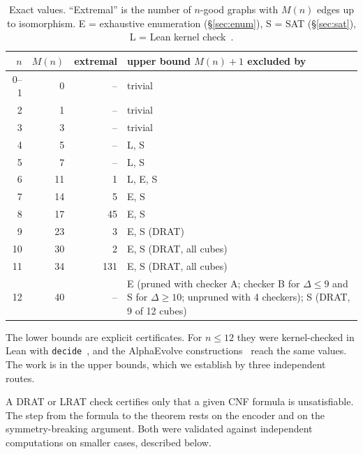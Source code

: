 \documentclass[11pt]{amsart}
\theoremstyle{definition}
\newcommand{\M}{M}
\begin{document}
\begin{table}[ht]
\centering
\caption{Exact values. ``Extremal'' is the number of $n$-good graphs with $\M(n)$ edges up
to isomorphism. E = exhaustive enumeration (\S\ref{sec:enum}), S = SAT
(\S\ref{sec:sat}), L = Lean kernel check~\cite{Repo}.}
\label{tab:exact}
\begin{tabular}{rrrp{}}
\toprule
$n$ & $\M(n)$ & extremal & upper bound $\M(n)+1$ excluded by\\
\midrule
0--1 & 0 & -- & trivial\\
2 & 1 & -- & trivial\\
3 & 3 & -- & trivial\\
4 & 5 & -- & L, S\\
5 & 7 & -- & L, S\\
6 & 11 & 1 & L, E, S\\
7 & 14 & 5 & E, S\\
8 & 17 & 45 & E, S\\
9 & 23 & 3 & E, S (DRAT)\\
10 & 30 & 2 & E, S (DRAT, all cubes)\\
11 & 34 & 131 & E, S (DRAT, all cubes)\\
12 & 40 & -- & E (pruned with checker A; checker B for $\Delta\le9$ and S for $\Delta\ge10$;
  unpruned with 4 checkers); S (DRAT, 9 of 12 cubes)\\
\bottomrule
\end{tabular}
\end{table}

The lower bounds are explicit certificates. For $n\le 12$ they were kernel-checked in Lean
with \texttt{decide}~\cite{Repo}, and the AlphaEvolve constructions~\cite{TaoAE} reach the
same values. The work is in the upper bounds, which we establish by three independent routes.

A DRAT or LRAT check certifies only that a given CNF formula is unsatisfiable. The step from
the formula to the theorem rests on the encoder and on the symmetry-breaking argument. Both
were validated against independent computations on smaller cases, described below.
\end{document}
